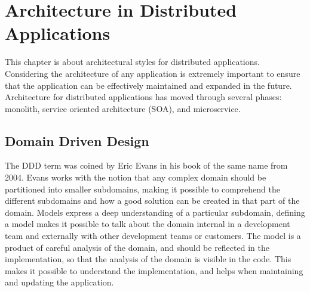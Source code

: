 \chapter{Architecture in Distributed Applications}
\label{ch:architecture}

This chapter is about architectural styles for distributed applications. Considering the architecture of any application is extremely important to ensure that the application can be effectively maintained and expanded in the future. Architecture for distributed applications has moved through several phases: monolith, service oriented architecture (SOA), and microservice.



\section{Domain Driven Design}
The DDD term was coined by Eric Evans in his book of the same name from 2004\cite[preface]{evans2004domain}. Evans works with the notion that any complex domain should be partitioned into smaller subdomains, making it possible to comprehend the different subdomains and how a good solution can be created in that part of the domain. Models express a deep understanding of a particular subdomain, defining a model makes it possible to talk about the domain internal in a development team and externally with other development teams or customers. The model is a product of careful analysis of the domain, and should be reflected in the implementation, so that the analysis of the domain is visible in the code. This makes it possible to understand the implementation, and helps when maintaining and updating the application\cite[p.~2]{evans2004domain}.

